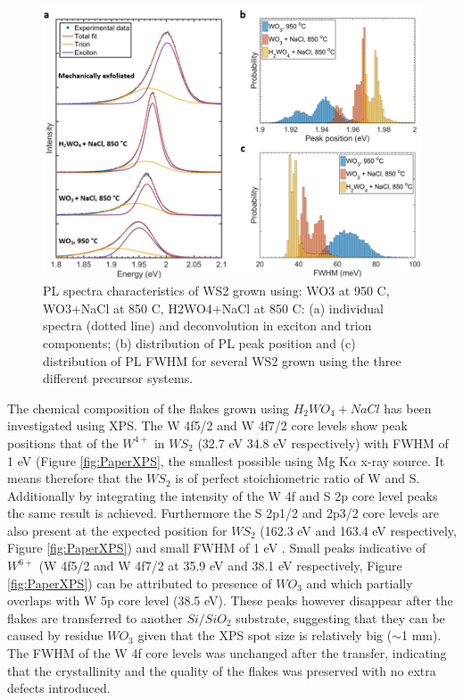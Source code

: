 \documentclass[12pt]{article}
\begin{document}
\begin{figure}[h]
\begin{center}
\includegraphics[scale=0.3]{PaperPLSpectraHistograms.png}
\caption{PL spectra characteristics of WS2 grown using: WO3 at 950 {\degree}C, WO3+NaCl at 850 {\degree}C, H2WO4+NaCl at 850 {\degree}C: (a) individual spectra (dotted line) and deconvolution in exciton and trion components; (b) distribution of PL peak position and (c) distribution of PL FWHM for several WS2 grown using the three different precursor systems.}
\label{fig:PaperPLSpectraHistograms}
\end{center}
\end{figure}

The chemical composition of the flakes grown using $H_2WO_4 + NaCl$ has been investigated using XPS. The W 4f5/2 and W 4f7/2 core levels show peak positions that of the $W^{4+}$ in $WS_2$ \cite{Cattelan2015}\cite{Martinez2004} (32.7 eV 34.8 eV respectively) with FWHM of 1 eV (Figure \ref{fig:PaperXPS}, the smallest possible using Mg K$\alpha$ x-ray source. It means therefore that the $WS_2$ is of perfect stoichiometric ratio of W and S. Additionally by integrating the intensity of the W 4f and S 2p core level peaks the same result is achieved. Furthermore the S 2p1/2 and 2p3/2 core levels are also present at the expected position for $WS_2$ (162.3 eV and 163.4 eV respectively, Figure \ref{fig:PaperXPS}) and small FWHM of 1 eV \cite{Martinez2004}. Small peaks indicative of $W^{6+}$ (W 4f5/2 and W 4f7/2 at 35.9 eV and 38.1 eV respectively, Figure \ref{fig:PaperXPS}) can be attributed to presence of $WO_3$ and which partially overlaps with W 5p core level (38.5 eV). These peaks however disappear after the flakes are transferred to another $Si/SiO_2$ substrate, suggesting that they can be caused by residue $WO_3$ given that the XPS spot size is relatively big ({$\sim$}1 mm). The FWHM of the W 4f core levels was unchanged after the transfer, indicating that the crystallinity and the quality of the flakes was preserved with no extra defects introduced.
\end{document}
